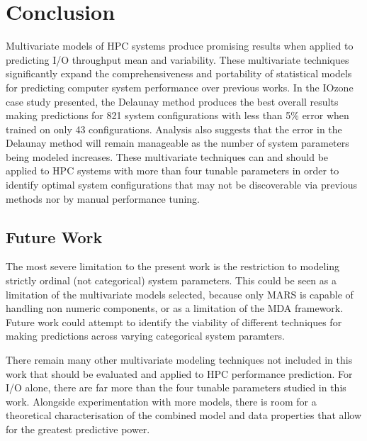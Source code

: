 \documentclass{scspaperproc}
\theoremstyle{scsthe}
\begin{document}

\section{Conclusion}
\label{sec:conclusion}
Multivariate models of HPC systems produce promising results when
applied to predicting I/O throughput mean and variability. These
multivariate techniques significantly expand the comprehensiveness and
portability of statistical models for predicting computer system
performance over previous works. In the IOzone case study presented,
the Delaunay method produces the best overall results making
predictions for 821 system configurations with less than 5\% error
when trained on only 43 configurations. Analysis also suggests that
the error in the Delaunay method will remain manageable as the number
of system parameters being modeled increases. These multivariate
techniques can and should be applied to HPC systems with more than
four tunable parameters in order to identify optimal system
configurations that may not be discoverable via previous methods nor
by manual performance tuning.

\subsection{Future Work}
The most severe limitation to the present work is the restriction to
modeling strictly ordinal (not categorical) system parameters. This
could be seen as a limitation of the multivariate models selected,
because only MARS is capable of handling non numeric components, or as
a limitation of the MDA framework. Future work could attempt to
identify the viability of different techniques for making predictions
across varying categorical system paramters.

There remain many other multivariate modeling techniques not included
in this work that should be evaluated and applied to HPC performance
prediction. For I/O alone, there are far more than the four tunable
parameters studied in this work. Alongside experimentation with more
models, there is room for a theoretical characterisation of the
combined model and data properties that allow for the greatest
predictive power.







\end{document}
